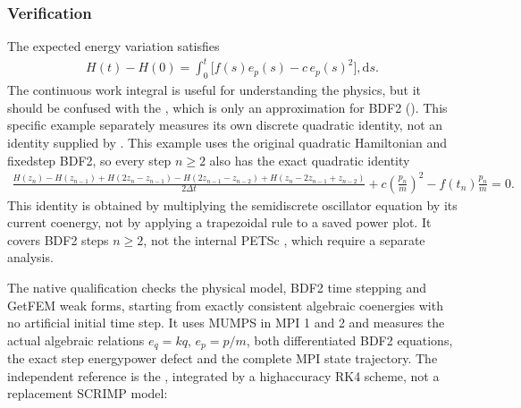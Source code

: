 \documentclass[letterpaper,10pt,english]{sphinxmanual}
\begin{document}
\subsubsection{Verification}
\label{\detokenize{examples/mass_spring_damper:verification}}
\sphinxAtStartPar
The expected energy variation satisfies
\begin{equation*}
\begin{split}H(t)-H(0)=\int_0^t\bigl[f(s)e_p(s)-c\,e_p(s)^2\bigr],\mathrm ds.\end{split}
\end{equation*}
\sphinxAtStartPar
The continuous work integral is useful for understanding the physics,
but it should  be confused with the , which is only an approximation
for BDF2 ({\hyperref[\detokenize{energy_and_power::doc}]{}}). This
specific example separately measures its own discrete
quadratic identity, not an identity supplied by
. This example uses the original quadratic Hamiltonian and
fixed\sphinxhyphen{}step BDF2, so every step \(n\geq2\) also has the exact
 quadratic identity
\begin{equation*}
\begin{split}\frac{
    H(z_n)-H(z_{n-1})
    +H(2z_n-z_{n-1})-H(2z_{n-1}-z_{n-2})
    +H(z_n-2z_{n-1}+z_{n-2})
}{2\Delta t}
+c\left(\frac{p_n}{m}\right)^2
-f(t_n)\frac{p_n}{m}=0.\end{split}
\end{equation*}
\sphinxAtStartPar
This identity is obtained by multiplying the 
semi\sphinxhyphen{}discrete oscillator equation by its current co\sphinxhyphen{}energy, not
by applying a trapezoidal rule to a saved power plot.
It covers BDF2 steps \(n\geq2\), not the internal PETSc
, which require a separate analysis.

\sphinxAtStartPar
The native qualification checks the physical model, BDF2 time
stepping and GetFEM weak forms, starting from exactly consistent
algebraic co\sphinxhyphen{}energies with no artificial initial time step.
It uses MUMPS in MPI 1 and 2 and measures the actual algebraic
relations
\(e_q=kq\), \(e_p=p/m\), both differentiated BDF2
equations, the exact step energy\sphinxhyphen{}power defect and the complete
MPI state trajectory. The independent reference is the
, integrated by a high\sphinxhyphen{}accuracy RK4
scheme, not a replacement SCRIMP model:
\end{document}
